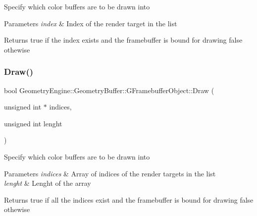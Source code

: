 Specify which color buffers are to be drawn into 
\begin{DoxyParams}{Parameters}
{\em index} & Index of the render target in the list \\
\hline
\end{DoxyParams}
\begin{DoxyReturn}{Returns}
true if the index exists and the framebuffer is bound for drawing false othewise 
\end{DoxyReturn}
\mbox{\label{class_geometry_engine_1_1_geometry_buffer_1_1_g_framebuffer_object_abb6147d96585c43a6c2d53fe2506a863}} 
\subsubsection{\texorpdfstring{Draw()}{Draw()}\hspace{0.1cm}{\footnotesize\ttfamily [2/2]}}
{\footnotesize\ttfamily bool Geometry\+Engine\+::\+Geometry\+Buffer\+::\+G\+Framebuffer\+Object\+::\+Draw (\begin{DoxyParamCaption}\item[{unsigned int $\ast$}]{indices,  }\item[{unsigned int}]{lenght }\end{DoxyParamCaption})}

Specify which color buffers are to be drawn into 
\begin{DoxyParams}{Parameters}
{\em indices} & Array of indices of the render targets in the list \\
\hline
{\em lenght} & Lenght of the array \\
\hline
\end{DoxyParams}
\begin{DoxyReturn}{Returns}
true if all the indices exist and the framebuffer is bound for drawing false othewise 
\end{DoxyReturn}
\mbox{\label{class_geometry_engine_1_1_geometry_buffer_1_1_g_framebuffer_object_a340d3969c1dae0c35115ffcd2ff3772a}} 
